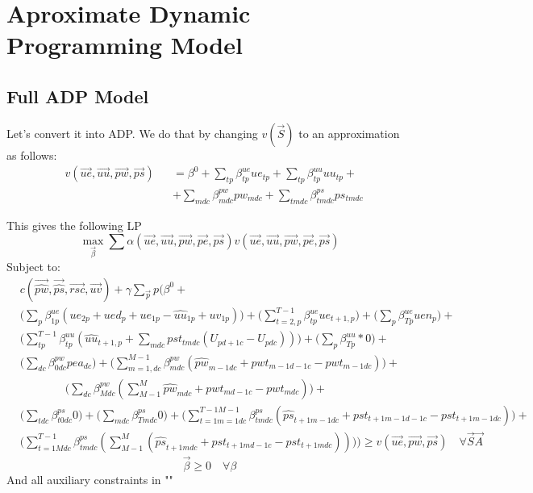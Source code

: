 \documentclass{article}
\begin{document}
\section{Aproximate Dynamic Programming Model}
\subsection{Full ADP Model}
Let's convert it into ADP. We do that by changing $v(\vec{S})$ to an approximation as follows:
\begin{equation}\begin{alignedat}{10}
	& v(\vec{ue}, \vec{uu}, \vec{pw}, \vec{ps}) 
		&& =  \beta^0 + \sum_{tp} \beta_{tp}^{ue} ue_{tp} +
			\sum_{tp} \beta_{tp}^{uu} uu_{tp} + \\
		& && + \sum_{mdc} \beta_{mdc}^{pw} pw_{mdc}  + 
			\sum_{tmdc} \beta_{tmdc}^{ps} ps_{tmdc}
\end{alignedat} \end{equation}

This gives the following LP
\begin{equation}
	\max_{\vec{\beta}} \sum \alpha (\vec{ue}, \vec{uu}, \vec{pw}, \vec{pe}, \vec{ps}) v(\vec{ue}, \vec{uu}, \vec{pw}, \vec{pe}, \vec{ps})
\end{equation}
Subject to:
\begin{equation}\begin{alignedat}{10}
\label{full-adp-equation}
	& c(\vec{\hat{pw}}, \vec{\hat{ps}}, \vec{rsc}, \vec{uv}) + \gamma \sum_{\vec{p}} p \Bigg( 
		\beta^0 + \\
	& 	\bigg( \sum_{p} \beta_{1p}^{ue} 
			(ue_{2p} + ued_{p} + ue_{1p} - \hat{uu}_{1p} + uv_{1p}) \bigg)+
		\bigg( \sum_{t=2,p}^{T-1} \beta_{tp}^{ue} ue_{t+1,p} \bigg)+ 
		\bigg( \sum_{p} \beta_{Tp}^{ue} uen_{p} \bigg) + \\
	& 	\bigg( \sum_{tp}^{T-1} \beta_{tp}^{uu} 
			( \hat{uu}_{t+1,p} + \sum_{mdc} pst_{tmdc} (U_{pd+1c} - U_{pdc})) \bigg) +
		\bigg( \sum_{p} \beta_{Tp}^{uu} * 0 \bigg) + \\
	& 	\bigg( \sum_{dc} \beta_{0dc}^{pw} pea_{dc} \bigg) +
		\bigg( \sum_{m=1,dc}^{M-1} \beta_{mdc}^{pw} 
			(\hat{pw}_{m-1dc} + pwt_{m-1d-1c} - pwt_{m-1dc}) \bigg) + \\
	&	\qquad \qquad \bigg( \sum_{dc} \beta_{Mdc}^{pw} 
			(\sum_{M-1}^{M} \hat{pw}_{mdc} + pwt_{md-1c} - pwt_{mdc})\bigg) + \\
	& 	\bigg( \sum_{tdc} \beta_{t0dc}^{ps} 0 \bigg) +
		\bigg( \sum_{mdc} \beta_{Tmdc}^{ps} 0 \bigg) +
		\bigg( \sum_{t=1m=1dc}^{T-1M-1} \beta_{tmdc}^{ps} 
			(\hat{ps}_{t+1m-1dc} + pst_{t+1m-1d-1c} - pst_{t+1m-1dc}) \bigg) + \\	
	&	\bigg( \sum_{t=1Mdc}^{T-1} \beta_{tmdc}^{ps} 
			(\sum_{M-1}^{M} (\hat{ps}_{t+1mdc} + pst_{t+1md-1c} - pst_{t+1mdc})) \bigg)
	\Bigg) \ge v(\vec{ue}, \vec{pw}, \vec{ps}) \quad \forall \vec{S} \vec{A}
\end{alignedat} \end{equation}
\begin{equation}
	\vec{\beta} \ge 0 \quad \forall \beta
\end{equation}
And all auxiliary constraints in ""
\end{document}
